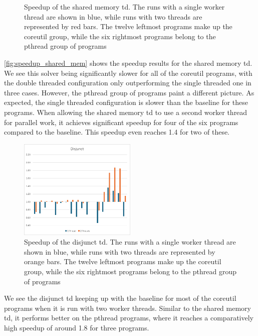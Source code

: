 \begin{figure}
    \caption[Speedup of the shared memory \ac{td}]{Speedup of the shared memory \ac{td}. The runs with a single worker thread are shown in blue, while runs with two threads are represented by red bars. The twelve leftmost programs make up the coreutil group, while the six rightmost programs belong to the pthread group of programs}
    \label{fig:speedup_shared_mem}
  \end{figure}

  \autoref{fig:speedup_shared_mem} shows the speedup results for the shared memory \ac{td}. We see this solver being significantly slower for all of the coreutil programs, with the double threaded configuration only outperforming the single threaded one in three cases. However, the pthread group of programs paint a different picture. As expected, the single threaded configuration is slower than the baseline for these programs. When allowing the shared memory \ac{td} to use a second worker thread for parallel work, it achieves significant speedup for four of the six programs compared to the baseline. This speedup even reaches 1.4 for two of these.

  \begin{figure}
    \includegraphics[width=0.5\textwidth]{../resources/Disjunct_draft.png}
    \caption[Speedup of the disjunct \ac{td}]{Speedup of the disjunct \ac{td}. The runs with a single worker thread are shown in blue, while runs with two threads are represented by orange bars. The twelve leftmost programs make up the coreutil group, while the six rightmost programs belong to the pthread group of programs}
    \label{fig:speedup_disjunct}
  \end{figure}

  We see the disjunct \ac{td} keeping up with the baseline for most of the coreutil programs when it is run with two worker threads. Similar to the shared memory \ac{td}, it performs better on the pthread programs, where it reaches a comparatively high speedup of around 1.8 for three programs.
